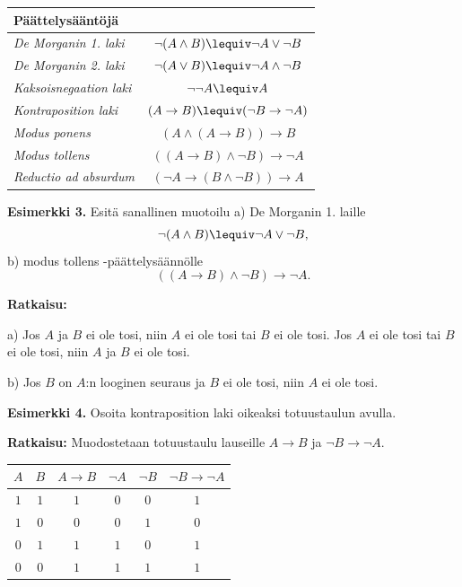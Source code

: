 \begin{tabular}{|l|c|}
\hline
{\bf Päättelysääntöjä} & \\\hline
{\em De Morganin 1. laki} & $\lnot(A \land B) \lequiv \lnot A \lor \lnot B$\\\hline
{\em De Morganin 2. laki} & $\lnot(A \lor B) \lequiv \lnot A \land \lnot B$\\\hline
{\em Kaksoisnegaation laki} & $\lnot \lnot A \lequiv A$\\\hline
{\em Kontraposition laki} & $(A\to B)\lequiv (\lnot B \to \lnot A)$\\\hline
{\em Modus ponens} & $(A\land (A\to B)) \to B$ \\\hline
{\em Modus tollens} & $((A\to B) \land \lnot B) \to \lnot A$ \\\hline
{\em Reductio ad absurdum} & $(\lnot A \to (B \land \lnot B))\to A$\\\hline
\end{tabular}

{\bf Esimerkki 3.}
Esitä  sanallinen muotoilu a) De Morganin 1. laille
\[
\lnot (A\land B) \lequiv \lnot A \lor \lnot B,
\]
b) modus tollens -päättelysäännölle
\[
((A\to B)\land \lnot B) \to \lnot A.
\]

{\bf Ratkaisu:}

a) Jos $A$ ja $B$ ei ole tosi, niin $A$ ei ole tosi tai $B$ ei ole tosi. Jos $A$ ei ole tosi tai $B$ ei ole tosi, niin $A$ ja $B$ ei ole tosi.

b) Jos $B$ on $A$:n looginen seuraus ja $B$ ei ole tosi, niin $A$ ei ole tosi.

{\bf Esimerkki 4.}
Osoita kontraposition laki oikeaksi totuustaulun avulla.

{\bf Ratkaisu:} 
Muodostetaan totuustaulu lauseille  $A\to B$  ja  $\lnot B \to \lnot A$.

\bigskip

\begin{center}
\begin{tabular}{|c|c|c|c|c|c|}\hline
$A$ & $B$ &  $A\to B$ & $\lnot A$  & $\lnot B$ & $\lnot B \to \lnot A$ \\ \hline
$1$ & $1$ & $1$ & $0$ & $0$ & $1$\\ 
$1$ & $0$ & $0$ & $0$ & $1$ & $0$\\
$0$ & $1$ & $1$ & $1$ & $0$ & $1$\\
$0$ & $0$ & $1$ & $1$ & $1$ & $1$\\ \hline
\end{tabular}
\end{center}

